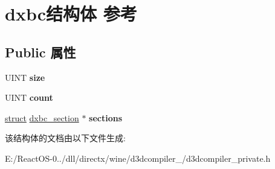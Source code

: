 \hypertarget{structdxbc}{}\section{dxbc结构体 参考}
\label{structdxbc}
\subsection*{Public 属性}
\begin{DoxyCompactItemize}
\item 
\mbox{\label{structdxbc_abd5dbd150206ff11bc99cfd9e8ff7c38}} 
U\+I\+NT {\bfseries size}
\item 
\mbox{\label{structdxbc_a420011dd037606e11f003669d3aa45e0}} 
U\+I\+NT {\bfseries count}
\item 
\mbox{\label{structdxbc_ac12526fb926d40ac41e62193fc98f257}} 
\hyperlink{interfacestruct}{struct} \hyperlink{structdxbc__section}{dxbc\+\_\+section} $\ast$ {\bfseries sections}
\end{DoxyCompactItemize}


该结构体的文档由以下文件生成\+:\begin{DoxyCompactItemize}
\item 
E\+:/\+React\+O\+S-\/0../dll/directx/wine/d3dcompiler\+\_/d3dcompiler\+\_\+private.\+h\end{DoxyCompactItemize}
